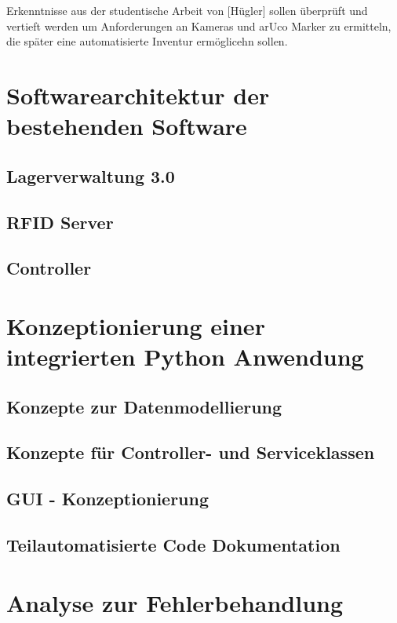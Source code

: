 \documentclass[11pt]{scrartcl}
\begin{document}
    Erkenntnisse aus der studentische Arbeit von [Hügler] sollen überprüft und vertieft werden um Anforderungen an Kameras und arUco Marker zu ermitteln, die später eine automatisierte Inventur ermöglicehn sollen.
    \newpage
    \section {Softwarearchitektur der bestehenden Software}

    \subsection {Lagerverwaltung 3.0}

    \subsection {RFID Server}

    \subsection {Controller}

    \newpage
    \section {Konzeptionierung einer integrierten Python Anwendung}

    \subsection {Konzepte zur Datenmodellierung}

    \subsection {Konzepte für Controller- und Serviceklassen}

    \subsection {GUI - Konzeptionierung}

    \subsection {Teilautomatisierte Code Dokumentation}

    \newpage
    \section{Analyse zur Fehlerbehandlung}
\end{document}
